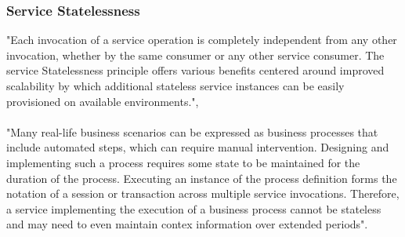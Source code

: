 \documentclass[12pt]{article}
\begin{document}
\subsubsection{Service Statelessness}
"Each invocation of a service operation is completely independent from any other invocation, whether by the same consumer or any other service consumer. The service Statelessness principle offers various benefits centered around improved scalability by which additional stateless service instances can be easily provisioned on available environments.", \cite[page 197]{grau}\\
\\
"Many real-life business scenarios can be expressed as business processes that include automated steps, which can require manual intervention. Designing and implementing such a process requires some state to be maintained for the duration of the process. Executing an instance of the process definition forms the notation of a session or transaction across multiple service invocations. Therefore, a service implementing the execution of a business process cannot be stateless and may need to even maintain contex information over extended periods".\cite[page 197]{grau} %
\end{document}
